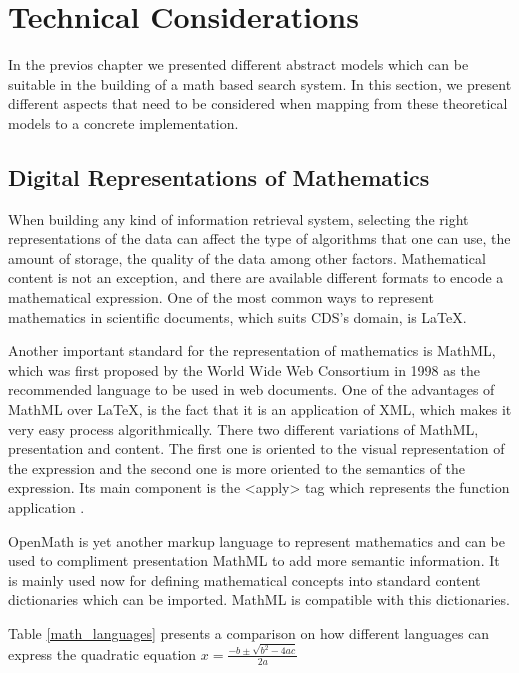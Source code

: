 \chapter{Technical Considerations}
\label{chapter-technical_considerations}
In the previos chapter we presented different abstract models which can be suitable in the building of a math based search system.
In this section, we present different aspects that need to be considered when mapping from these theoretical models to a concrete implementation.

\section{Digital Representations of Mathematics}
When building any kind of information retrieval system, selecting the right representations of the data can affect the type of algorithms that one can use, the amount of storage, the quality of the data among other factors. Mathematical content is not an exception, and there are available different formats to encode a mathematical expression. One of the most common ways to represent mathematics in scientific documents, which suits CDS's domain, is \LaTeX. 

Another  important standard for the representation of mathematics is MathML, which was first proposed by the World Wide Web Consortium in 1998 as the recommended language to be used in web documents. One of the advantages of MathML over LaTeX, is the fact that it is an application of XML, which makes it very easy process algorithmically. There two different variations of MathML, presentation and content. The first one is oriented to the visual representation of the expression and the second one is more oriented to the semantics of the expression. Its main component is the <apply> tag which represents the function application . 

OpenMath is yet another markup language to represent mathematics and can be used to compliment presentation MathML to add more semantic information. It is mainly used now for defining mathematical concepts into standard content dictionaries which can be imported. MathML is compatible with this dictionaries.

Table \ref{math_languages} presents a comparison on how different languages can express the quadratic equation $x = \frac{-b \pm \sqrt{b^2 - 4ac}}{2a} $


